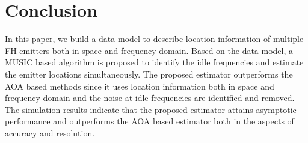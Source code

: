 \documentclass[journal,10pt]{IEEEtran}
\begin{document}



\section{Conclusion}
\label{sec:conclusion}
In this paper, we build a data model to describe location information of multiple FH emitters both in space and frequency domain. Based on the data model, a MUSIC based algorithm is proposed to identify the idle frequencies and estimate the emitter locations simultaneously.
The proposed estimator outperforms the AOA based methods since it uses location information both in space and frequency domain and the noise at idle frequencies are identified and removed.
The simulation results indicate that the proposed estimator attains asymptotic performance and outperforms the AOA based estimator both in the aspects of accuracy and resolution. 




\balance



\end{document}

